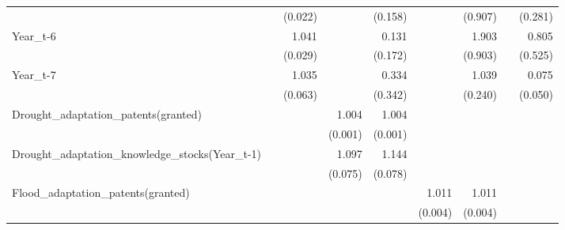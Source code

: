 \begin{table}[htbp]
\begin{tabular}{l*{8}{D{.}{.}{-1}}}
                    &                     &     (0.022)         &                     &     (0.158)         &                     &     (0.907)         &                     &     (0.281)         \\
Year\_t-6            &                     &       1.041         &                     &       0.131         &                     &       1.903         &                     &       0.805         \\
                    &                     &     (0.029)         &                     &     (0.172)         &                     &     (0.903)         &                     &     (0.525)         \\
Year\_t-7            &                     &       1.035         &                     &       0.334         &                     &       1.039         &                     &       0.075\sym{***}\\
                    &                     &     (0.063)         &                     &     (0.342)         &                     &     (0.240)         &                     &     (0.050)         \\
Drought\_adaptation\_patents(granted)&                     &                     &       1.004\sym{***}&       1.004\sym{***}&                     &                     &                     &                     \\
                    &                     &                     &     (0.001)         &     (0.001)         &                     &                     &                     &                     \\
Drought\_adaptation\_knowledge\_stocks(Year\_t-1)&                     &                     &       1.097         &       1.144\sym{**} &                     &                     &                     &                     \\
                    &                     &                     &     (0.075)         &     (0.078)         &                     &                     &                     &                     \\
Flood\_adaptation\_patents(granted)&                     &                     &                     &                     &       1.011\sym{**} &       1.011\sym{***}&                     &                     \\
                    &                     &                     &                     &                     &     (0.004)         &     (0.004)         &                     &                     \\

\end{tabular}
\end{table}
